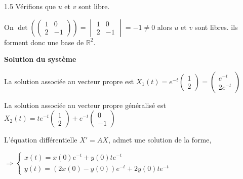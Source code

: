 \documentclass[12pt]{article}
\begin{document}
\begin{spacing}{1.5}
Vérifions que $u$ et $v$ sont libre.

On $\det(\begin{pmatrix}
1 & 0\\
2 & -1
\end{pmatrix})=\begin{vmatrix}
1 & 0\\
2 & -1
\end{vmatrix}=-1\neq 0$ alors $u$ et $v$ sont libres. ils forment donc une base de $\mathbb{R}^2$.

\medskip
\textbf{Solution du système}

La solution associée au vecteur propre est $X_1(t)=e^{-t}\begin{pmatrix}
1\\
2
\end{pmatrix}=\begin{pmatrix}
e^{-t}\\
2e^{-t}
\end{pmatrix}$


La solution associée au vecteur propre généralisé est $X_2(t)=te^{-t}\begin{pmatrix}
1\\
2
\end{pmatrix} + e^{-t}\begin{pmatrix}
0\\
-1
\end{pmatrix}$

L'équation différentielle $X'=AX$, admet une solution de la forme,



$\Rightarrow\begin{cases}
x(t)=x(0)e^{-t}+y(0)te^{-t}\\
y(t)=(2x(0)-y(0))e^{-t}+2y(0)te^{-t}
\end{cases}$



\end{spacing}
\end{document}
